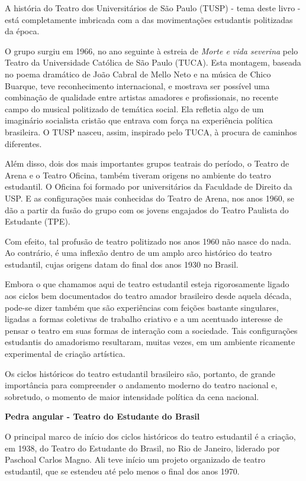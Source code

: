 A história do Teatro dos Universitários de São Paulo (TUSP) - tema deste
livro - está completamente imbricada com a das movimentações estudantis
politizadas da época.

O grupo surgiu em 1966, no ano seguinte à estreia de \textit{Morte e vida
severina} pelo Teatro da Universidade Católica de São Paulo (TUCA). Esta
montagem, baseada no poema dramático de João Cabral de Mello Neto e na
música de Chico Buarque, teve reconhecimento internacional, e mostrava
ser possível uma combinação de qualidade entre artistas amadores e
profissionais, no recente campo do musical politizado de temática
social. Ela refletia algo de um imaginário socialista cristão que
entrava com força na experiência política brasileira. O TUSP nasceu,
assim, inspirado pelo TUCA, à procura de caminhos diferentes.

Além disso, dois dos mais importantes grupos teatrais do período, o
Teatro de Arena e o Teatro Oficina, também tiveram origens no ambiente
do teatro estudantil. O Oficina foi formado por universitários da
Faculdade de Direito da USP. E as configurações mais conhecidas do
Teatro de Arena, nos anos 1960, se dão a partir da fusão do grupo com os
jovens engajados do Teatro Paulista do Estudante (TPE).

Com efeito, tal profusão de teatro politizado nos anos 1960 não nasce do
nada. Ao contrário, é uma inflexão dentro de um amplo arco histórico do
teatro estudantil, cujas origens datam do final dos anos 1930 no Brasil.

Embora o que chamamos aqui de teatro estudantil esteja rigorosamente
ligado aos ciclos bem documentados do teatro amador brasileiro desde
aquela década, pode-se dizer também que são experiências com feições
bastante singulares, ligadas a formas coletivas de trabalho criativo e a
um acentuado interesse de pensar o teatro em suas formas de interação
com a sociedade. Tais configurações estudantis do amadorismo resultaram,
muitas vezes, em um ambiente ricamente experimental de criação
artística.

Os ciclos históricos do teatro estudantil brasileiro são, portanto, de
grande importância para compreender o andamento moderno do teatro
nacional e, sobretudo, o momento de maior intensidade política da cena
nacional.

\textbf{Pedra angular - Teatro do Estudante do Brasil}

O principal marco de início dos ciclos históricos do teatro estudantil é
a criação, em 1938, do Teatro do Estudante do Brasil, no Rio de Janeiro,
liderado por Paschoal Carlos Magno. Ali teve início um projeto
organizado de teatro estudantil, que se estendeu até pelo menos o final
dos anos 1970.

